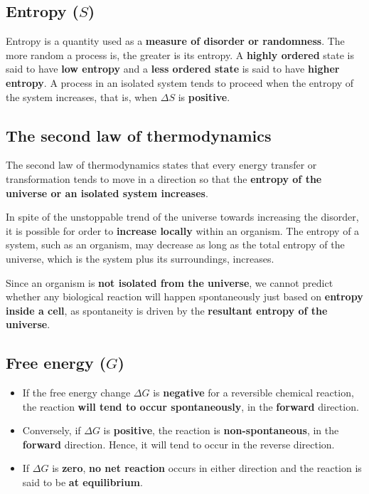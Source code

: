 \documentclass[11pt]{article}
\begin{document}
\subsection{Entropy (\(S\))}
\label{sec:orgdc8563f}
Entropy is a quantity used as a \textbf{measure of disorder or randomness}. The more random a process is, the greater is its entropy. A \textbf{highly ordered} state is said to have \textbf{low entropy} and a \textbf{less ordered state} is said to have \textbf{higher entropy}. A process in an isolated system tends to proceed when the entropy of the system increases, that is, when \(\Delta S\) is \textbf{positive}.
\subsection{The second law of thermodynamics}
\label{sec:org34ecdea}
The second law of thermodynamics states that every energy transfer or transformation tends to move in a direction so that the \textbf{entropy of the universe or an isolated system increases}.


In spite of the unstoppable trend of the universe towards increasing the disorder, it is possible for order to \textbf{increase locally} within an organism. The entropy of a system, such as an organism, may decrease as long as the total entropy of the universe, which is the system plus its surroundings, increases.


Since an organism is \textbf{not isolated from the universe}, we cannot predict whether any biological reaction will happen spontaneously just based on \textbf{entropy inside a cell}, as spontaneity is driven by the \textbf{resultant entropy of the universe}.

\newpage
\subsection{Free energy (\(G\))}
\label{sec:orgd3b7fd0}
\begin{itemize}
\item If the free energy change \(\Delta G\) is \textbf{negative} for a reversible chemical reaction, the reaction \textbf{will tend to occur spontaneously}, in the \textbf{forward} direction.
\item Conversely, if \(\Delta G\) is \textbf{positive}, the reaction is \textbf{non-spontaneous}, in the \textbf{forward} direction. Hence, it will tend to occur in the reverse direction.
\item If \(\Delta G\) is \textbf{zero}, \textbf{no net reaction} occurs in either direction and the reaction is said to be \textbf{at equilibrium}.
\end{itemize}
\end{document}
